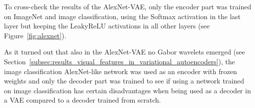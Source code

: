 To cross-check the results of the AlexNet-VAE, only the encoder part was trained on ImageNet and image classification, using the Softmax activation in the last layer but keeping the \ac{LeakyReLU} activations in all other layers (see Figure~\ref{fig:alexnet}).

As it turned out that also in the AlexNet-VAE no Gabor wavelets emerged (see Section~\ref{subsec:results_visual_features_in_variational_autoencoders}), the image classification AlexNet-like network was used as an encoder with frozen weights and only the decoder part was trained to see if using a network trained on image classification has certain disadvantages when being used as a decoder in a \ac{VAE} compared to a decoder trained from scratch.

